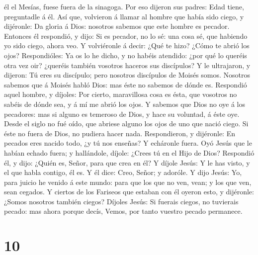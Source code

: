 él el Mesías, fuese fuera de la sinagoga.  Por eso
dijeron sus padres: Edad tiene, preguntadle á él.  Así
que, volvieron á llamar al hombre que había sido ciego, y dijéronle: Da
gloria á Dios: nosotros sabemos que este hombre es pecador.
 Entonces él respondió, y dijo: Si es pecador, no lo sé:
una cosa sé, que habiendo yo sido ciego, ahora veo.  Y
volviéronle á decir: ¿Qué te hizo? ¿Cómo te abrió los ojos?
 Respondióles: Ya os lo he dicho, y no habéis atendido:
¿por qué lo queréis otra vez oir? ¿queréis también vosotros haceros sus
discípulos?  Y le ultrajaron, y dijeron: Tú eres su
discípulo; pero nosotros discípulos de Moisés somos. 
Nosotros sabemos que á Moisés habló Dios: mas éste no sabemos de dónde
es.  Respondió aquel hombre, y díjoles: Por cierto,
maravillosa cosa es ésta, que vosotros no sabéis de dónde sea, y á mí me
abrió los ojos.  Y sabemos que Dios no oye á los
pecadores: mas si alguno es temeroso de Dios, y hace su voluntad, á éste
oye.  Desde el siglo no fué oído, que abriese alguno los
ojos de uno que nació ciego.  Si éste no fuera de Dios,
no pudiera hacer nada.  Respondieron, y dijéronle: En
pecados eres nacido todo, ¿y tú nos enseñas? Y echáronle fuera.
 Oyó Jesús que le habían echado fuera; y hallándole,
díjole: ¿Crees tú en el Hijo de Dios?  Respondió él, y
dijo: ¿Quién es, Señor, para que crea en él?  Y díjole
Jesús: Y le has visto, y el que habla contigo, él es.  Y
él dice: Creo, Señor; y adoróle.  Y dijo Jesús: Yo, para
juicio he venido á este mundo: para que los que no ven, vean; y los que
ven, sean cegados.  Y ciertos de los Fariseos que estaban
con él oyeron esto, y dijéronle: ¿Somos nosotros también ciegos?
 Díjoles Jesús: Si fuerais ciegos, no tuvierais pecado:
mas ahora porque decís, Vemos, por tanto vuestro pecado permanece.

\hypertarget{section-9}{%
\section{10}\label{section-9}}

